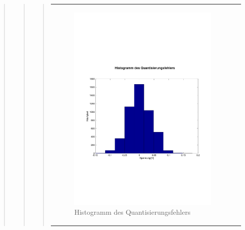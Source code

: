 \begin{quote}
\begin{quote}
\begin{quote}
\begin{center}
\begin{tabular}{ll}
                    \begin{minipage}{0.6\textwidth}
                        \begin{figure}[H]
                            \includegraphics[scale=0.4, trim = 0.8cm 7cm 0.8cm
                            8.5cm, clip]
                            {./Bilder/drei100_Histogramm}
                              \caption{Histogramm des Quantisierungsfehlers}
                        \end{figure}
                    \end{minipage}
                
                \end{tabular}
            \end{center}
            \vspace{1em}
            
        

\end{quote}
\end{quote}
\end{quote}
